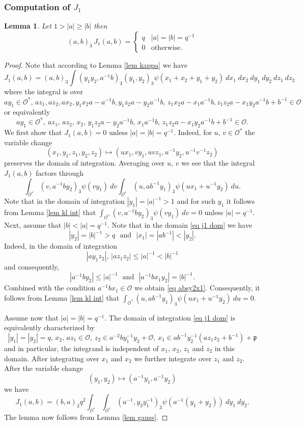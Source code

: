 \documentclass[12pt]{amsart}
\newcommand{\abs}[1]{\left|{#1}\right|}
\newcommand{\p}{\mathfrak{p}}
\renewcommand{\O}{\mathcal{O}}
\newtheorem{lemma}[theorem]{Lemma}
\theoremstyle{remark}
\begin{document}
\subsubsection{Computation of $J_1$} 
\begin{lemma}\label{lem J1}
Let $1>\abs{a}\ge\abs{b}$ then 
\[
(a,b)_3\,J_1(a,b)=\begin{cases} q & \abs{a}=\abs{b}=q^{-1} \\ 0 & \text{otherwise.}\end{cases}
\]
\end{lemma}
\begin{proof}

Note that according to Lemma \ref{lem kappa} we have
\[
J_1(a,b)=(a,b)_3\int (y_1y_2,a^{-1}b)_3(y_1,y_2)_3 \psi(x_1+x_2+y_1+y_2)\ dx_1\ dx_2\ dy_1\ dy_2\ dz_1\ dz_2
\]
where the integral is over
\[
ay_1\in \O^*,\, az_1, az_2, ax_2, y_1x_2 a-a^{-1}b, y_1z_2a-y_2a^{-1}b ,\,z_1x_2a-x_1a^{-1}b,  z_1z_2 a-x_1y_2a^{-1}b+b^{-1}\in \O
\]
or equivalently
\begin{equation}\label{eq j1 dom}
ay_1\in \O^*,\ az_1,\,az_2,\, x_2,\,y_1z_2a-y_2a^{-1}b ,\,x_1a^{-1}b,\,  z_1z_2 a-x_1y_2a^{-1}b+b^{-1}\in \O.
\end{equation}
We first show that $J_1(a,b)=0$ unless $\abs{a}=\abs{b}=q^{-1}$. Indeed, for $u,\,v\in \O^*$ the variable change
\[
(x_1,y_1,z_1,y_2,z_2)\mapsto (ux_1,vy_1,uvz_1,u^{-1}y_2,u^{-1}v^{-1}z_2)
\]
preserves the domain of integration. Averaging over $u,\,v$ we see that the integral $J_1(a,b)$ factors through
\[
\int_{\O^*}(v,a^{-1}by_2)_3\psi(vy_1)\ dv\int_{\O^*} (u,ab^{-1} y_1)_3\psi(ux_1+u^{-1}y_2)\ du.
\]
Note that in the domain of integration $\abs{y_1}=\abs{a}^{-1}>1$ and for such $y_1$ it follows from Lemma \ref{lem kl int} that $\int_{\O^*}(v,a^{-1}by_2)_3\psi(vy_1)\ dv=0$ unless $\abs{a}=q^{-1}$. Next, assume that $\abs{b}<\abs{a}=q^{-1}$.
Note that in the domain \eqref{eq j1 dom} we have 
\begin{equation}\label{eq absy2x1}
\abs{y_2}=\abs{b}^{-1}>q\ \ \ \text{and} \ \ \ \abs{x_1}=\abs{ab^{-1}}<\abs{y_2}.
\end{equation}
Indeed, in the domain of integration 
\[
\abs{ay_1z_2},\,\abs{az_1z_2}\le \abs{a}^{-1}<\abs{b}^{-1}
\]
and consequently,
\[
\abs{a^{-1}by_2}\le \abs{a}^{-1} \ \ \ \text{and}\ \ \ \abs{a^{-1}bx_1y_2}=\abs{b}^{-1}.
\]
Combined with the condition $a^{-1}bx_1\in \O$ we obtain \eqref{eq absy2x1}.
Consequently,  it follows from Lemma \ref{lem kl int} that 
$\int_{\O^*} (u,ab^{-1} y_1)_3\psi(ux_1+u^{-1}y_2)\ du=0$.

Assume now that $\abs{a}=\abs{b}=q^{-1}$. The domain of integration \eqref{eq j1 dom} is equivalently characterized by 
\[
\abs{y_1}=\abs{y_2}=q,\,x_2,\,az_1\in \O,\,z_2\in a^{-2}by_1^{-1}y_2+\O,\,x_1\in ab^{-1}y_2^{-1}(az_1z_2+b^{-1})+\p
\]
and in particular, the integrand is independent of $x_1,\,x_2,\,z_1$ and $z_2$ in this domain. After integrating over $x_1$ and $x_2$ we further integrate over $z_1$ and $z_2$. After the variable change 
\[
(y_1,y_2)\mapsto (a^{-1}y_1,a^{-1}y_2)
\]
we have
\[
J_1(a,b)=(b,a)_3 q^2\int_{\O^*}\int_{\O^*}(a^{-1},y_2y_1^{-1})_3\psi(a^{-1}(y_1+y_2))\ dy_1\ dy_2.
\]
The lemma now follows from Lemma \ref{lem gauss}.
\end{proof}
\end{document}
